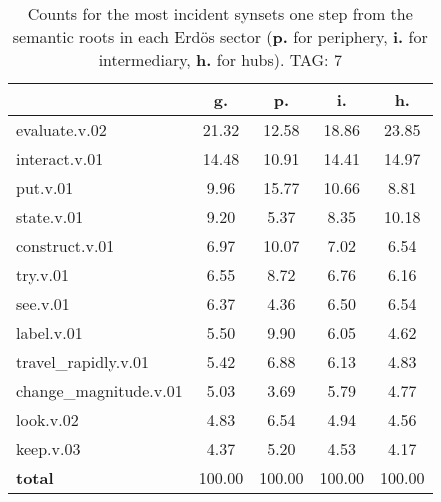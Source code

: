 \begin{table}[h!]
\begin{center}
\begin{tabular}{| l | c | c | c | c |}\hline
 & g. & p. & i. & h. \\\hline
evaluate.v.02 & 21.32  & 12.58  & 18.86  & 23.85 \\\hline
interact.v.01 & 14.48  & 10.91  & 14.41  & 14.97 \\\hline
put.v.01 & 9.96  & 15.77  & 10.66  & 8.81 \\\hline
state.v.01 & 9.20  & 5.37  & 8.35  & 10.18 \\\hline
construct.v.01 & 6.97  & 10.07  & 7.02  & 6.54 \\\hline
try.v.01 & 6.55  & 8.72  & 6.76  & 6.16 \\\hline
see.v.01 & 6.37  & 4.36  & 6.50  & 6.54 \\\hline
label.v.01 & 5.50  & 9.90  & 6.05  & 4.62 \\\hline
travel\_rapidly.v.01 & 5.42  & 6.88  & 6.13  & 4.83 \\\hline
change\_magnitude.v.01 & 5.03  & 3.69  & 5.79  & 4.77 \\\hline
look.v.02 & 4.83  & 6.54  & 4.94  & 4.56 \\\hline
keep.v.03 & 4.37  & 5.20  & 4.53  & 4.17 \\\hline
{{\bf total}} & 100.00  & 100.00  & 100.00  & 100.00 \\\hline
\end{tabular}
\caption{Counts for the most incident synsets one step from the semantic roots in each Erd\"os sector ({\bf p.} for periphery, {\bf i.} for intermediary, {\bf h.} for hubs). TAG: 7}
\end{center}
\end{table}